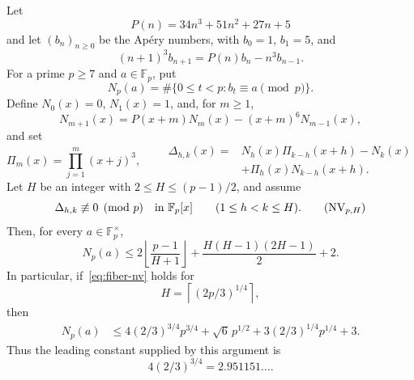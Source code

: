 \begin{proposition}
\label{prop:fiber-bound-conditional}
Let
\[
 P(n)=34n^3+51n^2+27n+5
\]
and let $(b_n)_{n\geq 0}$ be the Ap\'ery numbers, with
$b_0=1$, $b_1=5$, and
\[
 (n+1)^3b_{n+1}=P(n)b_n-n^3b_{n-1}.
\]
For a prime $p\geq 7$ and $a\in\mathbb F_p$, put
\[
 N_p(a)=\#\{0\leq t<p:b_t\equiv a\pmod p\}.
\]
Define $N_0(x)=0$, $N_1(x)=1$, and, for $m\geq1$,
\[
 N_{m+1}(x)=P(x+m)N_m(x)-(x+m)^6N_{m-1}(x),
\]
and set
\[
 \Pi_m(x)=\prod_{j=1}^m(x+j)^3,
 \qquad
 \begin{aligned}
 \Delta_{h,k}(x)
  ={}&N_h(x)\Pi_{k-h}(x+h)-N_k(x)\\
     &+\Pi_h(x)N_{k-h}(x+h).
 \end{aligned}
\]
Let $H$ be an integer with $2\leq H\leq(p-1)/2$, and assume
\begin{equation}
 \Delta_{h,k}\not\equiv0\pmod p
 \quad\text{in }\mathbb F_p[x]
 \qquad(1\leq h<k\leq H).
 \tag{NV$_{p,H}$}\label{eq:fiber-nv}
\end{equation}
Then, for every $a\in\mathbb F_p^\times$,
\begin{equation}
 N_p(a)
 \leq
 2\left\lfloor\frac{p-1}{H+1}\right\rfloor
 +\frac{H(H-1)(2H-1)}2+2.
 \label{eq:fiber-exact}
\end{equation}
In particular, if~\eqref{eq:fiber-nv} holds for
\[
 H=\left\lceil(2p/3)^{1/4}\right\rceil,
\]
then
\begin{align}
 N_p(a)
 &\leq 4(2/3)^{3/4}p^{3/4}
      +\sqrt6\,p^{1/2}
      +3(2/3)^{1/4}p^{1/4}+3.                 \label{eq:fiber-explicit}
\end{align}
Thus the leading constant supplied by this argument is
\[
4(2/3)^{3/4}=2.951151\ldots.
\]
\end{proposition}

